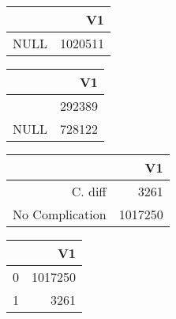 \bigskip\bigskip
\centering
\begin{tabular}{rr}
  \hline
 & V1 \\ 
  \hline
NULL & 1020511 \\ 
   \hline
\end{tabular}

\bigskip\bigskip
\centering
\begin{tabular}{rr}
  \hline
 & V1 \\ 
  \hline
 & 292389 \\ 
  NULL & 728122 \\ 
   \hline
\end{tabular}

\bigskip\bigskip
\centering
\begin{tabular}{rr}
  \hline
 & V1 \\ 
  \hline
C. diff & 3261 \\ 
  No Complication & 1017250 \\ 
   \hline
\end{tabular}

\bigskip\bigskip
\centering
\begin{tabular}{rr}
  \hline
 & V1 \\ 
  \hline
0 & 1017250 \\ 
  1 & 3261 \\ 
   \hline
\end{tabular}

